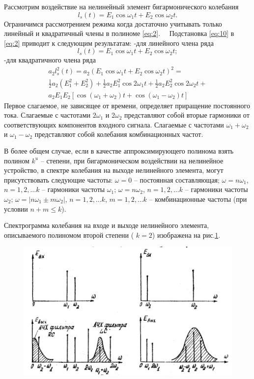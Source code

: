 Рассмотрим воздействие на нелинейный элемент бигармонического колебания
\begin{equation}
l_s(t)=E_1\cos\omega_1t+E_2\cos\omega_2t.
\label{eq:10}
\end{equation}
Ограничимся рассмотрением режима когда достаточно учитывать только линейный и квадратичный члены в полиноме \eqref{eq:2}. 
Подстановка \eqref{eq:10} в \eqref{eq:2} приводит к следующим результатам:
-для линейного члена ряда 
\begin{equation}
l_s(t)=E_1\cos\omega_1t+E_2\cos\omega_2t;
\label{eq:11}
\end{equation}
-для квадратичного члена ряда 
\begin{equation}
\begin{split}
a_2l_s^2(t)=a_2(E_1\cos\omega_1t+E_2\cos\omega_2t)^2 = \\
\frac{1}{2}a_2(E_1^2+E_2^2)+\frac{1}{2}a_2E_1^2\cos2\omega_1t+\frac{1}{2}a_2E_2^2\cos2\omega_2t+\\
a_2E_1E_2[\cos(\omega_1+\omega_2)t+\cos(\omega_1-\omega_2)t]
\label{eq:12}
\end{split}
\end{equation}
Первое слагаемое, не зависящее от времени, определяет приращение постоянного тока. Слагаемые с частотами $2\omega_1$ и $2\omega_2$ представляют собой вторые гармоники от соответствующих компонентов входного сигнала. Слагаемые с частотами $\omega_1+\omega_2$ и $\omega_1-\omega_2$ представляют собой колебания комбинационных частот.

В более общем случае, если в качестве аппроксимирующего полинома взять полином $k^u$ -- степени, при бигармоническом воздействии на нелинейное устройство, в спектре колебания на выходе нелинейного элемента, могут присутствовать следующие частоты:
$\omega=0$ -- постоянная составляющая; $\omega=n\omega_1$, $n=1,2,\ldots k$ -- гармоники частоты $\omega_1$; $\omega=n\omega_2$, $n=1,2,\ldots k$ -- гармоники частоты $\omega_2$; $\omega=|n\omega_1\pm m\omega_2|$, $n=1,2,\ldots k$, $m=1,2,\ldots k$ -- комбинационные частоты (при условии $n+m\leq k$).

Спектрограмма колебания на входе и выходе нелинейного элемента, описываемого полиномом второй степени ( $k=2$) изображена на рис.\ref{pic:4}.
\begin{figure}[h!]
	\centering
	\includegraphics[width=0.8\linewidth]{picture/pic4.jpg}
	\caption{}
	\label{pic:4}
\end{figure}

